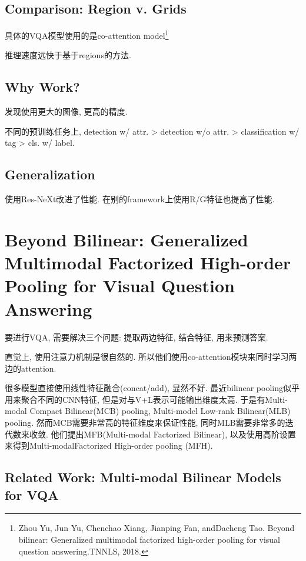 \documentclass{article}
\begin{document}
\subsection{Comparison: Region v. Grids}

具体的VQA模型使用的是co-attention model\footnote{
    Zhou Yu, Jun Yu, Chenchao Xiang, Jianping Fan, andDacheng Tao.  Beyond bilinear: Generalized multimodal factorized high-order pooling for visual question answering.TNNLS, 2018.
}

推理速度远快于基于regions的方法.

\subsection{Why Work?}

发现使用更大的图像, 更高的精度.

不同的预训练任务上, detection w/ attr. > detection w/o attr. > classification w/ tag > cls. w/ label.

\subsection{Generalization}

使用Res-NeXt改进了性能. 在别的framework上使用R/G特征也提高了性能.

\section{Beyond Bilinear: Generalized Multimodal Factorized High-order Pooling for Visual Question Answering}

要进行VQA, 需要解决三个问题: 提取两边特征, 结合特征, 用来预测答案. 

直觉上, 使用注意力机制是很自然的. 所以他们使用co-attention模块来同时学习两边的attention.

很多模型直接使用线性特征融合(concat/add), 显然不好. 最近bilinear pooling似乎用来聚合不同的CNN特征, 但是对与V+L表示可能输出维度太高. 于是有Multi-modal Compact Bilinear(MCB) pooling, Multi-model Low-rank Bilinear(MLB) pooling. 然而MCB需要非常高的特征维度来保证性能, 同时MLB需要非常多的迭代数来收敛. 他们提出MFB(Multi-modal Factorized Bilinear), 以及使用高阶设置来得到Multi-modalFactorized High-order pooling (MFH).

\subsection{Related Work: Multi-modal Bilinear Models for VQA}
\end{document}

